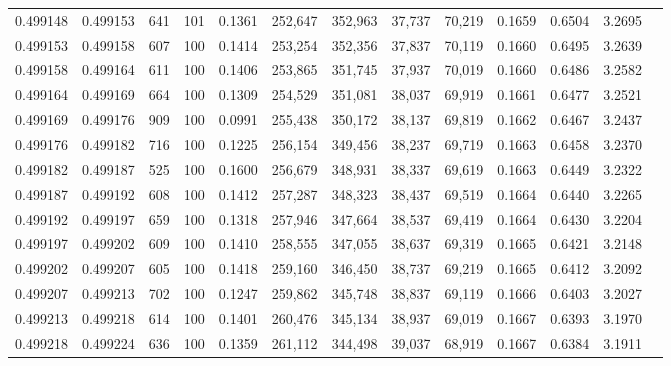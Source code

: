 \begin{tabular}{rrrrrrrrrrrrr}
0.499148 & 0.499153 &   641 & 101 &                                     0.1361 & 252,647 & 352,963 &  37,737 &  70,219 & 0.1659 & 0.6504 & 3.2695 \\
0.499153 & 0.499158 &   607 & 100 &                                     0.1414 & 253,254 & 352,356 &  37,837 &  70,119 & 0.1660 & 0.6495 & 3.2639 \\
0.499158 & 0.499164 &   611 & 100 &                                     0.1406 & 253,865 & 351,745 &  37,937 &  70,019 & 0.1660 & 0.6486 & 3.2582 \\
0.499164 & 0.499169 &   664 & 100 &                                     0.1309 & 254,529 & 351,081 &  38,037 &  69,919 & 0.1661 & 0.6477 & 3.2521 \\
0.499169 & 0.499176 &   909 & 100 &                                     0.0991 & 255,438 & 350,172 &  38,137 &  69,819 & 0.1662 & 0.6467 & 3.2437 \\
0.499176 & 0.499182 &   716 & 100 &                                     0.1225 & 256,154 & 349,456 &  38,237 &  69,719 & 0.1663 & 0.6458 & 3.2370 \\
0.499182 & 0.499187 &   525 & 100 &                                     0.1600 & 256,679 & 348,931 &  38,337 &  69,619 & 0.1663 & 0.6449 & 3.2322 \\
0.499187 & 0.499192 &   608 & 100 &                                     0.1412 & 257,287 & 348,323 &  38,437 &  69,519 & 0.1664 & 0.6440 & 3.2265 \\
0.499192 & 0.499197 &   659 & 100 &                                     0.1318 & 257,946 & 347,664 &  38,537 &  69,419 & 0.1664 & 0.6430 & 3.2204 \\
0.499197 & 0.499202 &   609 & 100 &                                     0.1410 & 258,555 & 347,055 &  38,637 &  69,319 & 0.1665 & 0.6421 & 3.2148 \\
0.499202 & 0.499207 &   605 & 100 &                                     0.1418 & 259,160 & 346,450 &  38,737 &  69,219 & 0.1665 & 0.6412 & 3.2092 \\
0.499207 & 0.499213 &   702 & 100 &                                     0.1247 & 259,862 & 345,748 &  38,837 &  69,119 & 0.1666 & 0.6403 & 3.2027 \\
0.499213 & 0.499218 &   614 & 100 &                                     0.1401 & 260,476 & 345,134 &  38,937 &  69,019 & 0.1667 & 0.6393 & 3.1970 \\
0.499218 & 0.499224 &   636 & 100 &                                     0.1359 & 261,112 & 344,498 &  39,037 &  68,919 & 0.1667 & 0.6384 & 3.1911 \\

\end{tabular}
